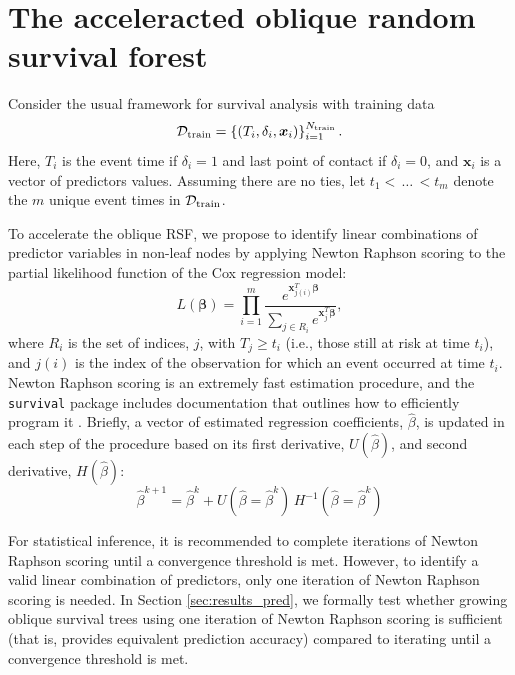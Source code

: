 \documentclass[twoside,11pt]{article}\usepackage[]{graphicx}\usepackage[]{xcolor}
\newcommand{\dataset}{{\cal D}}
\newcommand{\ie}{that is}
\newcommand{\secref}[1]{Section \ref{#1}}
\begin{document}
\section{The acceleracted oblique random survival forest}

Consider the usual framework for survival analysis with training data $$\dataset_{\text{train}} = \left\{ (T_i, \delta_i, \bm{x}_{i}) \right\}_{i=1}^{N_{\text{train}}}.$$ Here, $T_i$ is the event time if $\delta_i=1$ and last point of contact if $\delta_i=0$, and $\bm{x}_i$ is a vector of predictors values. Assuming there are no ties, let $t_1 < \, \ldots \, < t_m$ denote the $m$ unique event times in $\dataset_{\text{train}}$.

To accelerate the oblique RSF, we propose to identify linear combinations of predictor variables in non-leaf nodes by applying Newton Raphson scoring to the partial likelihood function of the Cox regression model:
\begin{equation}\label{eqn:cox-partial-likelihood}
L(\bm\beta) = \prod_{i=1}^m \frac{e^{\bm{x}_{j(i)}^T \bm\beta}}{\sum_{j \in R_i} e^{\bm{x}_j^T \bm\beta}},
\end{equation}
where $R_i$ is the set of indices, $j$, with $T_j \geq t_i$ (i.e., those still at risk at time $t_i$), and $j(i)$ is the index of the observation for which an event occurred at time $t_i$. Newton Raphson scoring is an extremely fast estimation procedure, and the \texttt{survival} package includes documentation that outlines how to efficiently program it \citep{therneau_survival_2022}. Briefly, a vector of estimated regression coefficients, $\hat{\beta}$, is updated in each step of the procedure based on its first derivative, $U(\hat{\beta})$, and second derivative, $H(\hat{\beta})$:
$$ \hat{\beta}^{k+1} =  \hat{\beta}^{k} + U(\hat{\beta} = \hat{\beta}^{k})\, H^{-1}(\hat{\beta} = \hat{\beta}^{k}) $$

For statistical inference, it is recommended to complete iterations of Newton Raphson scoring until a convergence threshold is met. However, to identify a valid linear combination of predictors, only one iteration of Newton Raphson scoring is needed. In \secref{sec:results_pred}, we formally test whether growing oblique survival trees using one iteration of Newton Raphson scoring is sufficient (\ie, provides equivalent prediction accuracy) compared to iterating until a convergence threshold is met.
\end{document}
